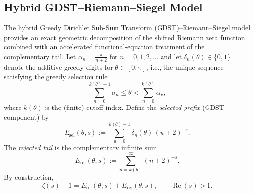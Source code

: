 \subsection{Hybrid GDST--Riemann--Siegel Model}

The hybrid Greedy Dirichlet Sub-Sum Transform (GDST)--Riemann--Siegel model provides an exact geometric decomposition of the shifted Riemann zeta function combined with an accelerated functional-equation treatment of the complementary tail. Let \(\alpha_n = \frac{\pi}{n+2}\) for \(n = 0,1,2,\dots\) and let \(\delta_n(\theta) \in \{0,1\}\) denote the additive greedy digits for \(\theta \in [0,\pi]\), i.e., the unique sequence satisfying the greedy selection rule
\[
\sum_{n=0}^{k(\theta)-1} \alpha_n \le \theta < \sum_{n=0}^{k(\theta)} \alpha_n,
\]
where \(k(\theta)\) is the (finite) cutoff index. Define the \emph{selected prefix} (GDST component) by
\begin{equation}
E_{\mathrm{sel}}(\theta,s) := \sum_{n=0}^{k(\theta)-1} \delta_n(\theta) \,(n+2)^{-s}.
\end{equation}
The \emph{rejected tail} is the complementary infinite sum
\begin{equation}
E_{\mathrm{rej}}(\theta,s) := \sum_{n=k(\theta)}^{\infty} (n+2)^{-s}.
\end{equation}
By construction,
\begin{equation}
\zeta(s) - 1 = E_{\mathrm{sel}}(\theta,s) + E_{\mathrm{rej}}(\theta,s), \qquad \operatorname{Re}(s) > 1.
\end{equation}

